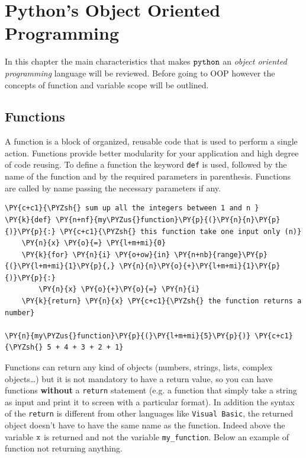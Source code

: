 \chapter{Python's Object Oriented Programming}\label{introduction-to-python---lesson-2}

In this chapter the main characteristics that makes $\tt{python}$ an \textit{object oriented programming} language will be reviewed.
Before going to OOP however the concepts of function and variable scope will be outlined.

\section{Functions}\label{functions}

A function is a block of organized, reusable code that is used to perform a single action. Functions provide better modularity for your application and high degree of code reusing.
To define a function the keyword \texttt{def} is used, followed by the name of the function and by the required parameters in parenthesis. Functions are called by name passing the necessary parameters if any.

\begin{tcolorbox}[breakable, size=fbox, boxrule=1pt, pad at break*=1mm,colback=cellbackground, colframe=cellborder]
\begin{Verbatim}[commandchars=\\\{\}]
\PY{c+c1}{\PYZsh{} sum up all the integers between 1 and n }
\PY{k}{def} \PY{n+nf}{my\PYZus{}function}\PY{p}{(}\PY{n}{n}\PY{p}{)}\PY{p}{:} \PY{c+c1}{\PYZsh{} this function take one input only (n)}
    \PY{n}{x} \PY{o}{=} \PY{l+m+mi}{0}
    \PY{k}{for} \PY{n}{i} \PY{o+ow}{in} \PY{n+nb}{range}\PY{p}{(}\PY{l+m+mi}{1}\PY{p}{,} \PY{n}{n}\PY{o}{+}\PY{l+m+mi}{1}\PY{p}{)}\PY{p}{:}
        \PY{n}{x} \PY{o}{+}\PY{o}{=} \PY{n}{i}
    \PY{k}{return} \PY{n}{x} \PY{c+c1}{\PYZsh{} the function returns a number}

\PY{n}{my\PYZus{}function}\PY{p}{(}\PY{l+m+mi}{5}\PY{p}{)} \PY{c+c1}{\PYZsh{} 5 + 4 + 3 + 2 + 1}
\end{Verbatim}
\end{tcolorbox}

Functions can return any kind of objects (numbers, strings, lists, complex objects\ldots{}) but it is not mandatory to have a return value, so you can have functions \textbf{without} a \texttt{return} statement (e.g. a function that simply take a string as input and print it to screen with a particular format).
In addition the syntax of the \texttt{return} is different from other languages like \texttt{Visual\ Basic}, the returned object doesn't have to have the same name as the function. Indeed above the variable $\tt{x}$ is returned and not the variable \texttt{my\_function}. Below an example of function not returning anything.

